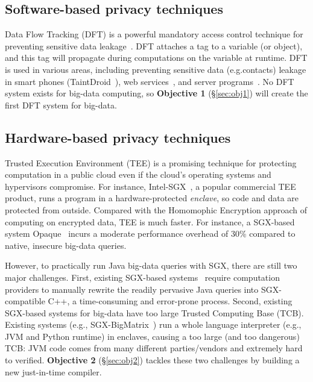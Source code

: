 \documentclass{article}
\newcommand{\chref}[1]{\S\ref{#1}}
\newcommand{\eg}{{e.g.}}
\begin{document}
\subsection{Software-based privacy techniques}
\label{sec:dft}\vspace{-.075in}

Data Flow Tracking (DFT) is a powerful mandatory access control technique for 
preventing sensitive data leakage~\cite{taintdroid:osdi10}. DFT attaches 
a tag to a variable (or object), and this tag will propagate during 
computations on the variable at runtime. DFT is used in various areas, 
including preventing sensitive data (\eg contacts) leakage in smart phones 
(TaintDroid~\cite{taintdroid:osdi10}), web services~\cite{cloudfence:raid13}, 
and server programs~\cite{libdft:vee12}. No DFT system exists for big-data 
computing, so \textbf{Objective 1} (\chref{sec:obj1}) will create the 
first DFT system for big-data.

\subsection{Hardware-based privacy techniques}
\label{sec:sgx}\vspace{-.075in}

Trusted Execution Environment (TEE) is a promising technique for
protecting computation in a public cloud even if the cloud's operating systems 
and hypervisors compromise. For instance, Intel-SGX~\cite{intel-sgx}, a 
popular commercial TEE product, runs a program in a hardware-protected 
\emph{enclave}, so code and data are protected from outside. Compared with the 
Homomophic Encryption approach of computing on encrypted data, TEE is much
faster. For instance, a SGX-based system Opaque~\cite{opaque:nsdi17} 
incurs a moderate performance overhead of 30\% compared to native, insecure 
big-data queries.

However, to practically run Java big-data queries with SGX, there are still two
major challenges. First, existing SGX-based systems~\cite{opaque:nsdi17} require
computation providers to manually rewrite the readily pervasive Java queries
into SGX-compatible C++, a time-consuming and error-prone process. Second,
existing SGX-based systems for big-data have too large Trusted Computing Base
(TCB). Existing systems (\eg, SGX-BigMatrix~\cite{bigmatrix:ccs17}) run a whole
language interpreter (\eg, JVM and Python runtime) in enclaves, causing a too
large (and too dangerous) TCB: JVM code comes from many different
parties/vendors and extremely hard to verified. \textbf{Objective 2}
(\chref{sec:obj2}) tackles these two challenges by building a new just-in-time
compiler.
\end{document}
